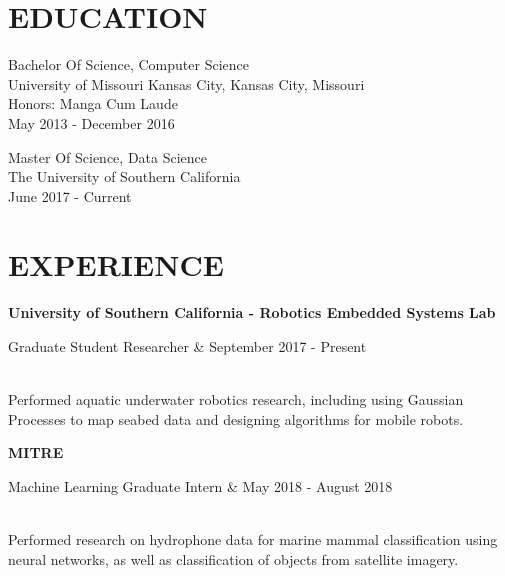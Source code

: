 \documentclass[margin,10pt]{res} %
\begin{document}

\address{ 2650 Van Buren Pl. \\ Los Angeles, California 90007  \\
(913) 908-6148 \\ cdennist@usc.edu \\ http://octopuscabbage.github.io \\}

\begin{resume}
 
\section{EDUCATION}       
 Bachelor Of Science, Computer Science  \\
                University of Missouri Kansas City, Kansas City, Missouri \\ 
                Honors: Manga Cum Laude\\
                May 2013 - December 2016 

 Master Of Science, Data Science \\
    The University of Southern California \\
    June 2017 - Current  
 
 
\section{EXPERIENCE}      
		{\bf University of Southern California - Robotics Embedded Systems Lab} \\
            \begin{ncolumn}{2}
            Graduate Student Researcher & September 2017 - Present
            \end{ncolumn} \\            
            Performed aquatic underwater robotics research, including using Gaussian Processes to map seabed data and  designing algorithms for mobile robots.
         
         {\bf MITRE} \\
            \begin{ncolumn}{2}
            Machine Learning Graduate Intern & May 2018 - August 2018
            \end{ncolumn} \\
            Performed research on hydrophone data for marine mammal classification using neural networks, as well as classification of objects from satellite imagery.    
 

\end{resume}
\end{document}
